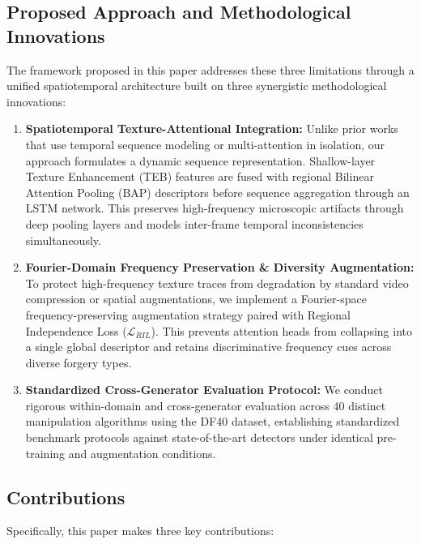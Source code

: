 \subsection{Proposed Approach and Methodological Innovations}
The framework proposed in this paper addresses these three limitations through a unified spatiotemporal architecture built on three synergistic methodological innovations:

\begin{enumerate}
    \item \textbf{Spatiotemporal Texture-Attentional Integration:} Unlike prior works that use temporal sequence modeling or multi-attention in isolation, our approach formulates a dynamic sequence representation. Shallow-layer Texture Enhancement (TEB) features are fused with regional Bilinear Attention Pooling (BAP) descriptors before sequence aggregation through an LSTM network. This preserves high-frequency microscopic artifacts through deep pooling layers and models inter-frame temporal inconsistencies simultaneously.
    
    \item \textbf{Fourier-Domain Frequency Preservation \& Diversity Augmentation:} To protect high-frequency texture traces from degradation by standard video compression or spatial augmentations, we implement a Fourier-space frequency-preserving augmentation strategy paired with Regional Independence Loss ($\mathcal{L}_{RIL}$). This prevents attention heads from collapsing into a single global descriptor and retains discriminative frequency cues across diverse forgery types.
    
    \item \textbf{Standardized Cross-Generator Evaluation Protocol:} We conduct rigorous within-domain and cross-generator evaluation across 40 distinct manipulation algorithms using the DF40 dataset, establishing standardized benchmark protocols against state-of-the-art detectors under identical pre-training and augmentation conditions.
\end{enumerate}

\subsection{Contributions}
Specifically, this paper makes three key contributions:

